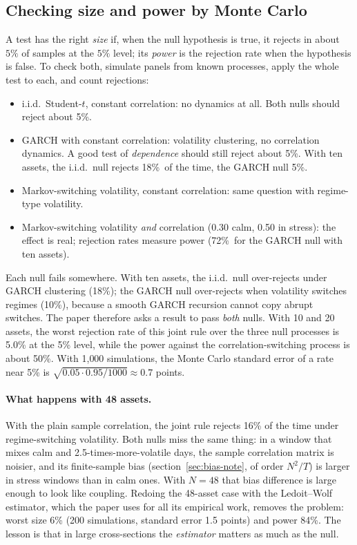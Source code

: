 \documentclass[11pt]{article}
\theoremstyle{plain}
\theoremstyle{definition}
\theoremstyle{remark}
\newcommand{\MCGARCHIID}{18\%}
\newcommand{\MCGARCHFHS}{5\%}
\newcommand{\MCPOWFHS}{72\%}
\begin{document}
\subsection{Checking size and power by Monte Carlo}

A test has the right \emph{size} if, when the null hypothesis is true, it
rejects in about $5\%$ of samples at the $5\%$ level; its \emph{power} is the
rejection rate when the hypothesis is false. To check both, simulate panels
from known processes, apply the whole test to each, and count rejections:
\begin{itemize}
\item i.i.d.\ Student-$t$, constant correlation: no dynamics at all. Both
nulls should reject about 5\%.
\item GARCH with constant correlation: volatility clustering, no
correlation dynamics. A good test of \emph{dependence} should still reject
about 5\%. With ten assets, the i.i.d.\ null rejects \MCGARCHIID\ of the time, the GARCH null
\MCGARCHFHS.
\item Markov-switching volatility, constant correlation: same question with
regime-type volatility.
\item Markov-switching volatility \emph{and} correlation (0.30 calm, 0.50 in
stress): the effect is real; rejection rates measure power
(\MCPOWFHS\ for the GARCH null with ten assets).
\end{itemize}

Each null fails somewhere. With ten assets, the i.i.d.\ null over-rejects
under GARCH clustering (18\%); the GARCH null over-rejects when volatility
switches regimes (10\%), because a smooth GARCH recursion cannot copy abrupt
switches. The paper therefore asks a result to pass \emph{both} nulls. With 10
and 20 assets, the worst rejection rate of this joint rule over the three null
processes is 5.0\% at the 5\% level, while the power against the
correlation-switching process is about 50\%. With 1{,}000 simulations, the
Monte Carlo standard error of a rate near 5\% is
$\sqrt{0.05\cdot0.95/1000}\approx0.7$ points.

\paragraph{What happens with 48 assets.} With the plain sample correlation,
the joint rule rejects 16\% of the time under regime-switching volatility.
Both nulls miss the same thing: in a window that mixes calm and
2.5-times-more-volatile days, the sample correlation matrix is noisier, and
its finite-sample bias (section~\ref{sec:bias-note}, of order $N^2/T$) is
larger in stress windows than in calm ones. With $N=48$ that bias difference
is large enough to look like coupling. Redoing the 48-asset case with the
Ledoit--Wolf estimator, which the paper uses for all its empirical work,
removes the problem: worst size 6\% (200 simulations, standard error 1.5
points) and power 84\%. The lesson is that in large cross-sections the
\emph{estimator} matters as much as the null.
\end{document}

